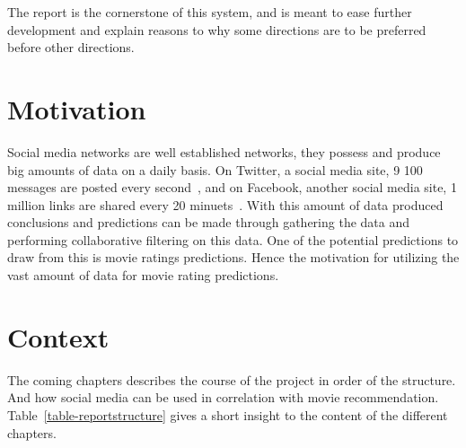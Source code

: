 The report is the cornerstone of this system, and is meant to ease further development and explain reasons to why some directions are to be preferred before other directions.


\section{Motivation}
Social media networks are well established networks, they possess and produce big amounts of data on a daily basis. On Twitter, a social media site, 9 100 messages are posted every second~\cite{twitt-stats}, and on Facebook, another social media site, 1 million links are shared every 20 minuets~\cite{face-stats}. With this amount of data produced conclusions and predictions can be made through gathering the data and performing collaborative filtering on this data. One of the potential predictions to draw from this is movie ratings predictions. Hence the motivation for utilizing the vast amount of data for movie rating predictions.


\section{Context}
The coming chapters describes the course of the project in order of the structure. And how social media can be used in correlation with movie recommendation. Table~\ref{table-reportstructure} gives a short insight to the content of the different chapters.

